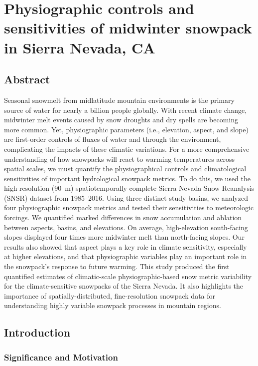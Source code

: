 \hypertarget{ch2}{%
\chapter{Physiographic controls and sensitivities of midwinter snowpack in Sierra Nevada, CA}\label{ch2}}

\hypertarget{ch2-abstract}{\section{Abstract}\label{ch2-abstract}}


Seasonal snowmelt from midlatitude mountain environments is the primary source of water for nearly a billion people globally. With recent climate change, midwinter melt events caused by snow droughts and dry spells are becoming more common. Yet, physiographic parameters (i.e., elevation, aspect, and slope) are first-order controls of fluxes of water and through the environment, complicating the impacts of these climatic variations. For a more comprehensive understanding of how snowpacks will react to warming temperatures across spatial scales, we must quantify the physiographical controls and climatological sensitivities of important hydrological snowpack metrics. To do this, we used the high-resolution (90~m) spatiotemporally complete Sierra Nevada Snow Reanalysis (SNSR) dataset from 1985--2016. Using three distinct study basins, we analyzed four physiographic snowpack metrics and tested their sensitivities to meteorologic forcings. We quantified marked differences in snow accumulation and ablation between aspects, basins, and elevations. On average, high-elevation south-facing slopes displayed four times more midwinter melt than north-facing slopes. Our results also showed that aspect plays a key role in climate sensitivity, especially at higher elevations, and that physiographic variables play an important role in the snowpack's response to future warming. This study produced the first quantified estimates of climatic-scale physiographic-based snow metric variability for the climate-sensitive snowpacks of the Sierra Nevada. It also highlights the importance of spatially-distributed, fine-resolution snowpack data for understanding highly variable snowpack processes in mountain regions.

\hypertarget{ch2-intro}{\section{Introduction}\label{ch2-intro}}
\hypertarget{ch2-intro-1}{\subsection{Significance and Motivation}\label{ch2-intro-1}}


